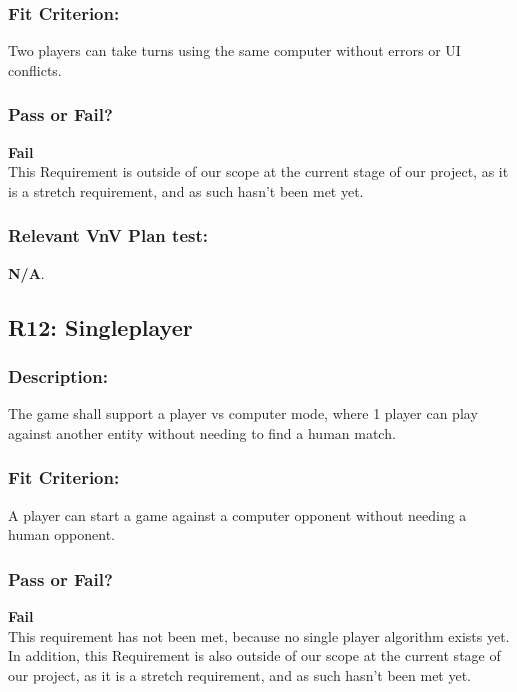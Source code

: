 \documentclass[12pt, titlepage]{article}
\begin{document}
\subsubsection{Fit Criterion:}Two players can take turns using the same computer without errors or UI conflicts.

\subsubsection{Pass or Fail?} 

 \noindent \textbf{Fail}\\
 
 \noindent  This Requirement is outside of our scope at the current stage of our project, as it is a stretch requirement, and as such hasn't been met yet.

\subsubsection{Relevant VnV Plan test: } \textbf{N/A}. 

\subsection{R12: Singleplayer} 

\subsubsection{Description:}The game shall support a player vs computer mode, where 1 player can play against another entity without needing to find a human match.

\subsubsection{Fit Criterion:} A player can start a game against a computer opponent without needing a human opponent.

\subsubsection{Pass or Fail?} 

 \noindent \textbf{Fail}\\
 
 \noindent This requirement has not been met, because no single player algorithm exists yet. In addition, this Requirement is also outside of our scope at the current stage of our project, as it is a stretch requirement, and as such hasn't been met yet.
\end{document}
